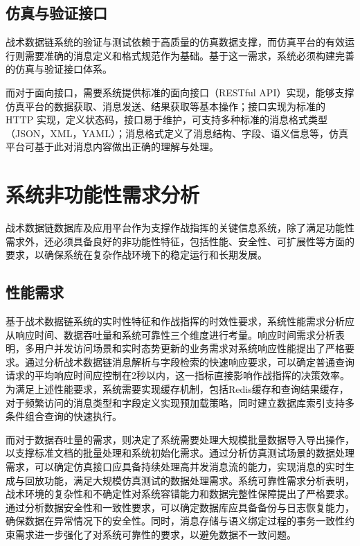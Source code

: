\subsection{仿真与验证接口}
战术数据链系统的验证与测试依赖于高质量的仿真数据支撑，而仿真平台的有效运行则需要准确的消息定义和格式规范作为基础。基于这一需求，系统必须构建完善的仿真与验证接口体系。

而对于面向接口，需要系统提供标准的面向接口（RESTful API）实现，能够支撑仿真平台的数据获取、消息发送、结果获取等基本操作；接口实现为标准的 HTTP 实现，定义状态码，接口易于维护，可支持多种标准的消息格式类型（JSON，XML，YAML）；消息格式定义了消息结构、字段、语义信息等，仿真平台可基于此对消息内容做出正确的理解与处理。

\section{系统非功能性需求分析}

战术数据链数据库及应用平台作为支撑作战指挥的关键信息系统，除了满足功能性需求外，还必须具备良好的非功能性特征，包括性能、安全性、可扩展性等方面的要求，以确保系统在复杂作战环境下的稳定运行和长期发展\cite{Kagioglidis_2009}。

\subsection{性能需求}
基于战术数据链系统的实时性特征和作战指挥的时效性要求，系统性能需求分析应从响应时间、数据吞吐量和系统可靠性三个维度进行考量\cite{Kee_2008,baek2016_adhoc,baek2019_jsyst_timemirror}。响应时间需求分析表明，多用户并发访问场景和实时态势更新的业务需求对系统响应性能提出了严格要求。通过分析战术数据链消息解析与字段检索的快速响应要求，可以确定普通查询请求的平均响应时间应控制在2秒以内，这一指标直接影响作战指挥的决策效率。为满足上述性能要求，系统需要实现缓存机制，包括Redis缓存和查询结果缓存，对于频繁访问的消息类型和字段定义实现预加载策略，同时建立数据库索引支持多条件组合查询的快速执行。

而对于数据吞吐量的需求，则决定了系统需要处理大规模批量数据导入导出操作，以支撑标准文档的批量处理和系统初始化需求。通过分析仿真测试场景的数据处理需求，可以确定仿真接口应具备持续处理高并发消息流的能力，实现消息的实时生成与回放功能，满足大规模仿真测试的数据处理需求\cite{lee2018_jsyst,Spyridis_2010,Kopp_Throughput_Enhanced_JTIDS_2006,Juarez_2025}。系统可靠性需求分析表明，战术环境的复杂性和不确定性对系统容错能力和数据完整性保障提出了严格要求。通过分析数据安全性和一致性要求，可以确定数据库应具备备份与日志恢复能力，确保数据在异常情况下的安全性。同时，消息存储与语义绑定过程的事务一致性约束需求进一步强化了对系统可靠性的要求，以避免数据不一致问题\cite{Koromilas_2009,EverythingRF_STT}。


